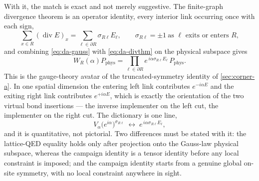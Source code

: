 With it, the match is exact and not merely suggestive. The finite-graph
divergence theorem is an operator identity, every interior link occurring once
with each sign,
\begin{equation}
  \sum_{x\in R}(\operatorname{div}E)_x=\sum_{\ell\in\partial R}\sigma_{R\ell}E_\ell,
  \qquad
  \sigma_{R\ell}=\pm1\ \text{as $\ell$ exits or enters $R$},
  \label{eq:da-divthm}
\end{equation}
and combining \eqref{eq:da-gauss} with \eqref{eq:da-divthm} on the physical
subspace gives
\begin{equation}
  \boxed{\;
  W_R(\alpha)P_{\mathrm{phys}}
  =\prod_{\ell\in\partial R}e^{\,i\alpha\sigma_{R\ell}E_\ell}\,P_{\mathrm{phys}} .\;}
  \label{eq:da-telescope}
\end{equation}
This is the gauge-theory avatar of the truncated-symmetry identity of
\cref{sec:corner-a}. In one spatial dimension the entering left link
contributes $e^{-i\alpha E}$ and the exiting right link contributes
$e^{+i\alpha E}$, which is exactly the orientation of the two virtual bond
insertions --- the inverse implementer on the left cut, the implementer on the
right cut. The dictionary is one line,
\begin{equation}
  V_\alpha\bigl(e^{i\alpha}\bigr)^{\sigma_{R\ell}}
  \;\longleftrightarrow\;
  e^{\,i\alpha\sigma_{R\ell}E_\ell},
  \label{eq:da-dictionary}
\end{equation}
and it is quantitative, not pictorial. Two differences must be stated with it:
the lattice-QED equality holds only after projection onto the Gauss-law
physical subspace, whereas the campaign identity is a tensor identity before any
local constraint is imposed; and the campaign identity starts from a genuine
global on-site symmetry, with no local constraint anywhere in sight.

